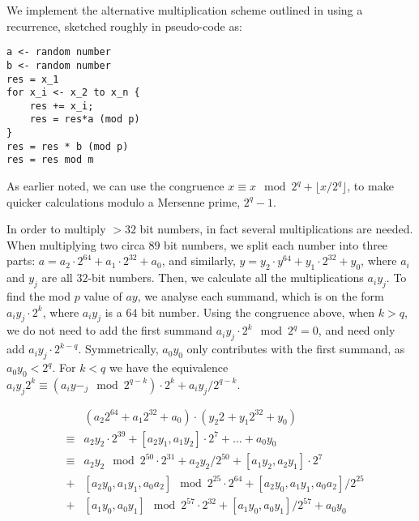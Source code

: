 \documentclass[]{article}
\begin{document}
We implement the alternative multiplication scheme outlined in \cite{thorupNotes} using a recurrence, sketched roughly in pseudo-code as:
\begin{verbatim}
a <- random number
b <- random number
res = x_1
for x_i <- x_2 to x_n {
    res += x_i;
    res = res*a (mod p)
}
res = res * b (mod p)
res = res mod m
\end{verbatim}

%

As earlier noted, we can use the congruence $x \equiv x\mod 2^q + \lfloor x / 2^q \rfloor$, to make quicker calculations modulo a Mersenne prime, $2^q -1$.

In order to multiply $>32$ bit numbers, in fact several multiplications are needed. When multiplying two circa $89$ bit numbers, we split each number into three parts: $a = a_2\cdot 2^{64} + a_1 \cdot 2^{32} + a_0$, and similarly, $y = y_2\cdot y^{64} + y_1 \cdot 2^{32} + y_0$, where $a_i$ and $y_j$ are all $32$-bit numbers. Then, we calculate all the multiplications $a_i y_j$. To find the mod $p$ value of $ay$, we analyse each summand, which is on the form $a_i y_j \cdot 2^{k}$, where $a_i y_j$ is a $64$ bit number. Using the congruence above, when $k>q$, we do not need to add the first summand $a_i y_j \cdot 2^k \mod 2^q = 0$, and need only add $a_i y_j \cdot 2^{k-q}$. Symmetrically, $a_0 y_0$ only contributes with the first summand, as $a_0 y_0 < 2^q$. For $k<q$ we have the equivalence $a_i y_j 2^k \equiv (a_i y-_j \mod 2^{q-k})\cdot 2^k + a_i y_j / 2^{q-k}$.

\[\begin{matrix}
& & (a_2 2^{64} + a_1 2^{32} + a_0)\cdot (y_2 2^{} + y_1 2^{32} + y_0) \\
& \equiv & a_2 y_2 \cdot 2^{39} + [a_2 y_1,a_1 y_2] \cdot 2^7 + \ldots + a_0 y_0 \\
& \equiv & a_2 y_2 \mod 2^{50} \cdot 2^{31} + a_2 y_2 / 2^{50} + [a_1 y_2, a_2 y_1] \cdot 2^7 \\
& + & [a_2 y_0, a_1 y_1, a_0 a_2] \mod 2^{25} \cdot 2^{64} + [a_2 y_0, a_1 y_1, a_0 a_2] /2^{25} \\
& + & [a_1 y_0, a_0 y_1] \mod 2^{57} \cdot 2^{32} + [a_1 y_0, a_0 y_1] /2^{57} + a_0 y_0
\end{matrix}
\]
\end{document}
